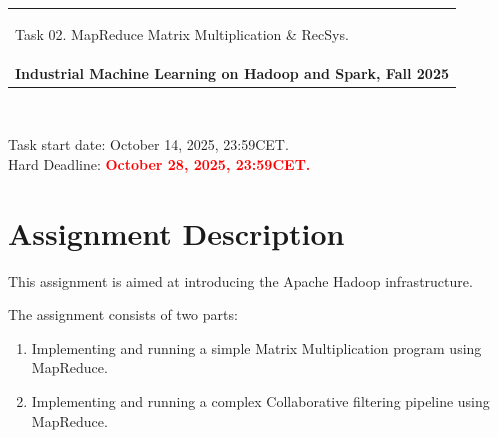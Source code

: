 \documentclass[10pt,fleqn]{article}
\begin{document}
\begin{center}
    \begin{tabular}{|p{17.5cm}|}
        \hline
        \begin{center} \Large Task 02. MapReduce Matrix Multiplication \& RecSys. \end{center}\\
        \textbf{Industrial Machine Learning on Hadoop and Spark, Fall 2025}\\
        \hline
    \end{tabular}
\end{center}

\

\begin{tabbing}
Task start date: October 14, 2025, 23:59CET.\\
Hard Deadline: \textcolor{red}{\bf October 28, 2025, 23:59CET.}
\end{tabbing}

\section*{Assignment Description}
This assignment is aimed at introducing the Apache Hadoop infrastructure.

The assignment consists of two parts:
\begin{enumerate}
 \item Implementing and running a simple Matrix Multiplication program using MapReduce.
 \item Implementing and running a complex Collaborative filtering pipeline using MapReduce.
\end{enumerate}
\end{document}
